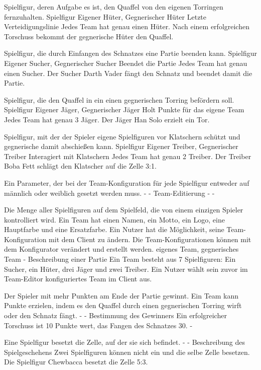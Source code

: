 {Spielfigur, deren Aufgabe es ist, den Quaffel von den eigenen Torringen fernzuhalten.}
{Spielfigur}
{Eigener Hüter, Gegnerischer Hüter}
{Letzte Verteidigungslinie}
{Jedes Team hat genau einen Hüter.}
{Nach einem erfolgreichen Torschuss bekommt der gegnerische Hüter den Quaffel.}

{Spielfigur, die durch Einfangen des Schnatzes eine Partie beenden kann.}
{Spielfigur}
{Eigener Sucher, Gegnerischer Sucher}
{Beendet die Partie}
{Jedes Team hat genau einen Sucher.}
{Der Sucher \glqq{}Darth Vader\grqq{} fängt den Schnatz und beendet damit die Partie.}

{Spielfigur, die den Quaffel in ein einen gegnerischen Torring befördern soll.}
{Spielfigur}
{Eigener Jäger, Gegnerischer Jäger}
{Holt Punkte für das eigene Team}
{Jedes Team hat genau 3 Jäger.}
{Der Jäger \glqq{}Han Solo\grqq{} erzielt ein Tor.}

{Spielfigur, mit der der Spieler eigene Spielfiguren vor Klatschern schützt und gegnerische damit abschießen kann.}
{Spielfigur}
{Eigener Treiber, Gegnerischer Treiber}
{Interagiert mit Klatschern}
{Jedes Team hat genau 2 Treiber.}
{Der Treiber \glqq{}Boba Fett\grqq{} schlägt den Klatscher auf die Zelle 3:1.}

{Ein Parameter, der bei der Team-Konfiguration für jede Spielfigur entweder auf \glqq{}männlich\grqq{} oder \glqq{}weiblich\grqq{} gesetzt werden muss.}
{-}
{-}
{Team-Editierung}
{-}
{-}

{Die Menge aller Spielfiguren auf dem Spielfeld, die von einem einzigen Spieler kontrolliert wird. Ein Team hat einen Namen, ein Motto, ein Logo, eine Hauptfarbe und eine Ersatzfarbe. Ein Nutzer hat die Möglichkeit, seine Team-Konfiguration mit dem Client zu ändern. Die Team-Konfigurationen können mit dem Konfigurator verändert und erstellt werden.}
{eigenes Team, gegnerisches Team}
{-}
{Beschreibung einer Partie}
{Ein Team besteht aus 7 Spielfiguren: Ein Sucher, ein Hüter, drei Jäger und zwei Treiber.}
{Ein Nutzer wählt sein zuvor im Team-Editor konfiguriertes Team im Client aus.}

{Der Spieler mit mehr Punkten am Ende der Partie gewinnt. Ein Team kann Punkte erzielen, indem es den Quaffel durch einen gegnerischen Torring wirft oder den Schnatz fängt.}
{-}
{-}
{Bestimmung des Gewinners}
{Ein erfolgreicher Torschuss ist 10 Punkte wert, das Fangen des Schnatzes 30.}
{-}

{Eine Spielfigur besetzt die Zelle, auf der sie sich befindet.}
{-}
{-}
{Beschreibung des Spielgeschehens}
{Zwei Spielfiguren können nicht ein und die selbe Zelle besetzen.}
{Die Spielfigur \glqq{}Chewbacca\grqq{} besetzt die Zelle 5:3.}

